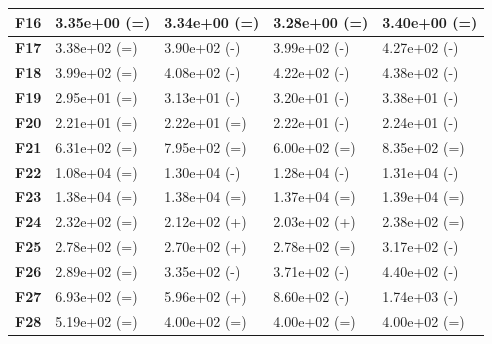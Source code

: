 \documentclass[12pt,a4paper]{report}
\begin{document}
{{{{{{\begin{table}[]
\begin{tabular}{|l|l|l|l|l|}
{\bf F16} & 3.35e+00 (=)        & 3.34e+00 (=)     & 3.28e+00 (=)     & 3.40e+00 (=)     \\ \hline
{\bf F17} & 3.38e+02 (=)        & 3.90e+02 (-)     & 3.99e+02 (-)     & 4.27e+02 (-)     \\ \hline
{\bf F18} & 3.99e+02 (=)        & 4.08e+02 (-)     & 4.22e+02 (-)     & 4.38e+02 (-)     \\ \hline
{\bf F19} & 2.95e+01 (=)        & 3.13e+01 (-)     & 3.20e+01 (-)     & 3.38e+01 (-)     \\ \hline
{\bf F20} & 2.21e+01 (=)        & 2.22e+01 (=)     & 2.22e+01 (-)     & 2.24e+01 (-)     \\ \hline
{\bf F21} & 6.31e+02 (=)        & 7.95e+02 (=)     & 6.00e+02 (=)     & 8.35e+02 (=)     \\ \hline
{\bf F22} & 1.08e+04 (=)        & 1.30e+04 (-)     & 1.28e+04 (-)     & 1.31e+04 (-)     \\ \hline
{\bf F23} & 1.38e+04 (=)        & 1.38e+04 (=)     & 1.37e+04 (=)     & 1.39e+04 (=)     \\ \hline
{\bf F24} & 2.32e+02 (=)        & 2.12e+02 (+)     & 2.03e+02 (+)     & 2.38e+02 (=)     \\ \hline
{\bf F25} & 2.78e+02 (=)        & 2.70e+02 (+)     & 2.78e+02 (=)     & 3.17e+02 (-)     \\ \hline
{\bf F26} & 2.89e+02 (=)        & 3.35e+02 (-)     & 3.71e+02 (-)     & 4.40e+02 (-)     \\ \hline
{\bf F27} & 6.93e+02 (=)        & 5.96e+02 (+)     & 8.60e+02 (-)     & 1.74e+03 (-)     \\ \hline
{\bf F28} & 5.19e+02 (=)        & 4.00e+02 (=)     & 4.00e+02 (=)     & 4.00e+02 (=)     \\ \hline
\end{tabular}
\end{table}

}}}}}}
\end{document}
